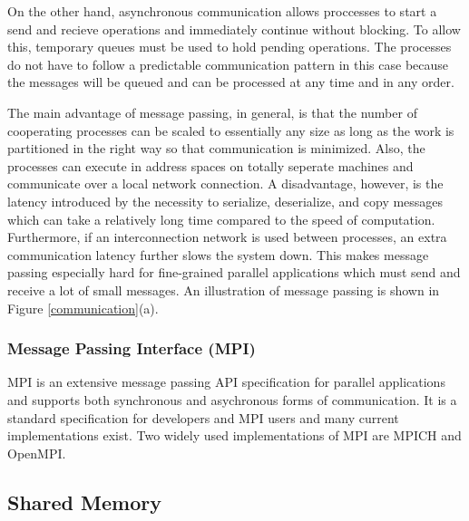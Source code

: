 \documentclass[11pt]{book}
\begin{document}
On the other hand, asynchronous communication allows proccesses to start a send and recieve
operations and immediately continue without blocking.  To allow this, temporary queues must be used
to hold pending operations.  The processes do not have to follow a predictable communication pattern
in this case because the messages will be queued and can be processed at any time and in any order.

The main advantage of message passing, in general, is that the number of cooperating processes can
be scaled to essentially any size as long as the work is partitioned in the right way so that
communication is minimized.  Also, the processes can execute in address spaces on totally seperate
machines and communicate over a local network connection.  A disadvantage, however, is the latency
introduced by the necessity to serialize, deserialize, and copy messages which can take a relatively
long time compared to the speed of computation.  Furthermore, if an interconnection network is used
between processes, an extra communication latency further slows the system down.  This makes message
passing especially hard for fine-grained parallel applications which must send and receive a lot of
small messages.  An illustration of message passing is shown in Figure \ref{communication}(a).

\subsubsection{Message Passing Interface (MPI)}

MPI \cite{gropp-94} is an extensive message passing API specification for parallel applications and
supports both synchronous and asychronous forms of communication.  It is a standard specification
for developers and MPI users and many current implementations exist.  Two widely used
implementations of MPI are MPICH and OpenMPI.

\subsection{Shared Memory}
\end{document}
